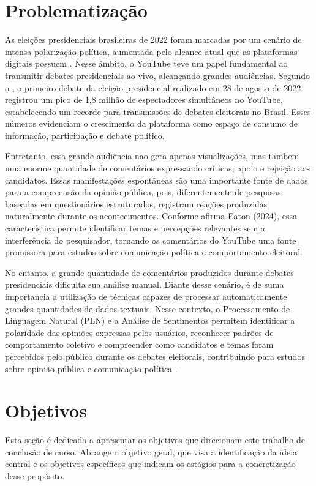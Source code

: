 \documentclass[
	12pt,				%
	openright,			%
	oneside,			%
	a4paper,			%
	english,			%
	brazil				%
	]{abntex2}
\begin{document}
\section{Problematização}

As eleições presidenciais brasileiras de 2022 foram marcadas por um cenário de intensa polarização política, aumentada pelo alcance atual que as plataformas digitais possuem \cite{Alfaro_2025}. Nesse âmbito, o YouTube teve um papel fundamental ao transmitir debates presidenciais ao vivo, alcançando grandes audiências. Segundo o \cite{Poder360}, o primeiro debate da eleição presidencial realizado em 28 de agosto de 2022 registrou um pico de 1,8 milhão de espectadores simultâneos no YouTube, estabelecendo um recorde para transmissões de debates eleitorais no Brasil. Esses números evidenciam o crescimento da plataforma como espaço de consumo de informação, participação e debate político.

Entretanto, essa grande audiência nao gera apenas visualizações, mas tambem uma enorme quantidade de comentários expressando críticas, apoio e rejeição aos candidatos. Essas manifestações espontâneas são uma importante fonte de dados para a compreensão da opinião pública, pois, diferentemente de pesquisas baseadas em questionários estruturados, registram reações produzidas naturalmente durante os acontecimentos. Conforme afirma Eaton (2024), essa característica permite identificar temas e percepções relevantes sem a interferência do pesquisador, tornando os comentários do YouTube uma fonte promissora para estudos sobre comunicação política e comportamento eleitoral.

No entanto, a grande quantidade de comentários produzidos durante debates presidenciais dificulta sua análise manual. Diante desse cenário, é de suma importancia a utilização de técnicas capazes de processar automaticamente grandes quantidades de dados textuais. Nesse contexto, o Processamento de Linguagem Natural (PLN) e a Análise de Sentimentos permitem identificar a polaridade das opiniões expressas pelos usuários, reconhecer padrões de comportamento coletivo e compreender como candidatos e temas foram percebidos pelo público durante os debates eleitorais, contribuindo para estudos sobre opinião pública e comunicação política \cite{Munger2025}.


\section{Objetivos}
Esta seção é dedicada a apresentar os objetivos que direcionam este trabalho de conclusão de curso. Abrange o objetivo geral, que visa a identificação da ideia central e os objetivos específicos que indicam os estágios para a concretização desse propósito.
\end{document}
